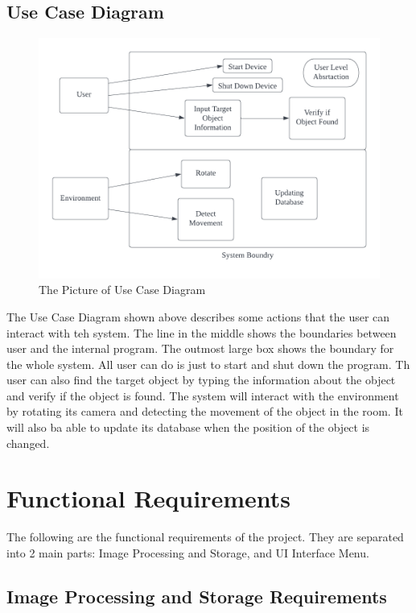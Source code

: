 \documentclass[12pt]{article}
\begin{document}
\subsection{Use Case Diagram}
\begin{figure}[H]
    \centering
    \includegraphics[scale=0.8]{Use.png}
    \caption{The Picture of Use Case Diagram}
\end{figure}
The Use Case Diagram shown above describes some actions that the user can interact with teh system. The line in the middle shows the boundaries between user and the internal program. The outmost large box shows the boundary for the whole system. All user can do is just to start and shut down the program. Th user can also find the target object by typing the information about the object and verify if the object is found. The system will interact with the environment by rotating its camera and detecting the movement of the object in the room. It will also ba able to update its database when the position of the object is changed. 

\section{Functional Requirements}
The following are the functional requirements of the project. They are separated into 2 main parts: Image Processing and Storage, and UI Interface Menu.
\subsection{Image Processing and Storage Requirements}
\end{document}
